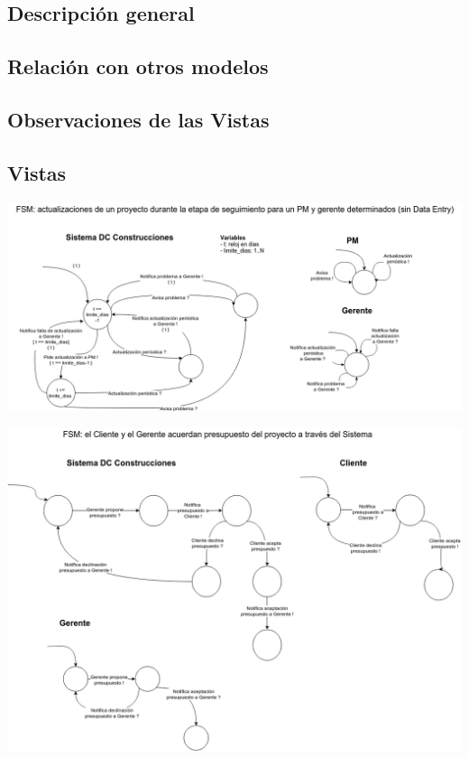 \subsection{Descripción general}

\subsection{Relación con otros modelos}

\subsection{Observaciones de las Vistas}


\newpage
\subsection{Vistas}
\begin{center}
\includegraphics[scale=0.5, angle=90]{imagenes/FSM1.png}
\end{center}

\newpage
\begin{center}
\includegraphics[scale=0.5, angle=90]{imagenes/FSM2.png}
\end{center}

